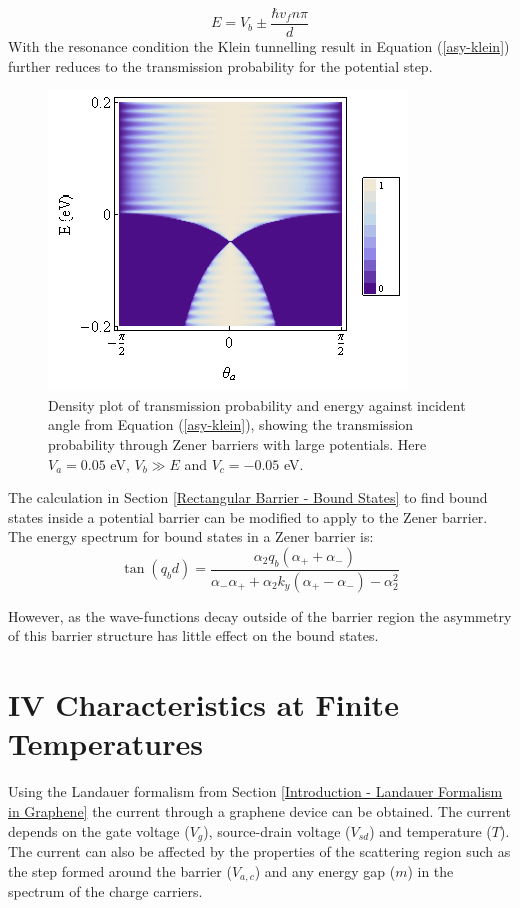 			\begin{equation}
				E=V_{b}\pm \frac{\hbar v_{f}n \pi}{d}
			\end{equation}
			With the resonance condition the Klein tunnelling result in Equation (\ref{asy-klein}) further reduces to the transmission probability for the potential step.
			\begin{figure}[h]
				\centerline{\includegraphics[scale=0.7]{images/asy-7}}
				\caption{Density plot of transmission probability and energy against incident angle from Equation (\ref{asy-klein}), showing the transmission probability through Zener barriers with large potentials. Here $V_{a}=0.05$ eV, $V_{b}\gg E$ and $V_{c}=-0.05$ eV.}
				\label{asy-7}
			\end{figure}

			The calculation in Section \ref{Rectangular Barrier - Bound States} to find bound states inside a potential barrier can be modified to apply to the Zener barrier. The energy spectrum for bound states in a Zener barrier is:
			\begin{equation}
				\tan(q_{b}d)=\frac{\alpha_{2}q_{b}\left(\alpha_{+}+\alpha_{-}\right)}{\alpha_{-}\alpha_{+}+\alpha_{2}k_{y}\left(\alpha_{+}-\alpha_{-}\right)-\alpha_{2}^{2}}
			\end{equation}
			
			However, as the wave-functions decay outside of the barrier region the asymmetry of this barrier structure has little effect on the bound states.
		\section{IV Characteristics at Finite Temperatures}
		\label{Asymmetrical Barrier - IV Characteristics at Finite Temperatures}
		Using the Landauer formalism from Section \ref{Introduction - Landauer Formalism in Graphene} the current through a graphene device can be obtained. The current depends on the gate voltage ($V_{g}$), source-drain voltage ($V_{sd}$) and temperature ($T$). The current can also be affected by the properties of the scattering region such as the step formed around the barrier ($V_{a,c}$) and any energy gap ($m$) in the spectrum of the charge carriers.

